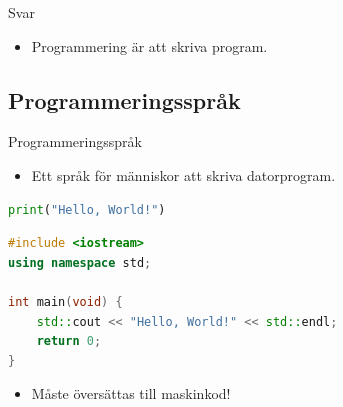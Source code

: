 \begin{frame}
  \begin{block}{Svar}
    \begin{itemize}
      \item Programmering är att skriva program.
    \end{itemize}
  \end{block}
\end{frame}


\subsection{Programmeringsspråk}

\begin{frame}
  \begin{block}{Programmeringsspråk}
    \begin{itemize}
      \item Ett språk för människor att skriva datorprogram.
    \end{itemize}
  \end{block}
\end{frame}

\begin{frame}[fragile]
  \begin{example}[Python]
    \begin{lstlisting}[language=python]
print("Hello, World!")
    \end{lstlisting}
  \end{example}

  \pause

  \begin{example}[C++]
    \begin{lstlisting}[language=c++]
#include <iostream>
using namespace std;

int main(void) {
    std::cout << "Hello, World!" << std::endl;
    return 0;
}
    \end{lstlisting}
  \end{example}
\end{frame}

\begin{frame}
  \begin{remark}
    \begin{itemize}
      \item Måste översättas till maskinkod!
    \end{itemize}
  \end{remark}
\end{frame}


